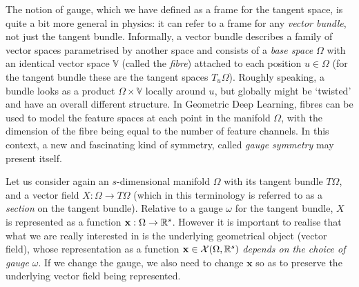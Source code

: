 The notion of gauge, which we have defined as a frame for the tangent space, is 
%
quite a bit more general in physics:  it can refer to a frame for any \emph{vector bundle}, not just the tangent bundle. 
%
Informally, a vector bundle describes a family of vector spaces parametrised by another space and 
consists of a \emph{base space} $\Omega$ with an identical vector space $\mathbb{V}$ (called the \emph{fibre}) attached to each position $u \in \Omega$ (for the tangent bundle these are the tangent spaces $T_u\Omega$).  
%
Roughly speaking, a bundle looks as a product $\Omega \times \mathbb{V}$ locally around $u$, but globally might be `twisted' and have an overall different structure. 
%
%
%
%
%
In Geometric Deep Learning, fibres %
can be used to model the feature spaces at each point in the manifold $\Omega$, with the dimension of the fibre being equal to the number of feature channels. 
In this context, a new and fascinating kind of symmetry, called \emph{gauge symmetry} may present itself.%






Let us consider again an $s$-dimensional manifold $\Omega$ with its tangent bundle $T\Omega$, and a vector field 
$X : \Omega \rightarrow T \Omega$ (which in this terminology is referred to as a {\em section} on the tangent bundle). 
%
Relative to a gauge $\omega$ for the tangent bundle, $X$ is represented as a function $\mathbf{x} : \Omega \rightarrow \mathbb{R}^s$.
However it is important to realise that what we are really interested in is the underlying geometrical object (vector field), whose representation as a function $\mathbf{x} \in \mathcal{X}(\Omega,\mathbb{R}^s)$ {\em depends on the choice of gauge} $\omega$. 
%
If we change the gauge, we also need to change $\mathbf{x}$ so as to preserve the underlying vector field being represented.

